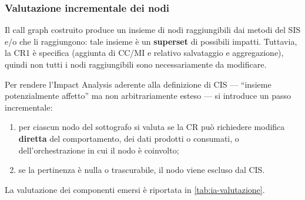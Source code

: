 \documentclass[11pt,a4paper]{article}
\begin{document}
\subsubsection{Valutazione incrementale dei nodi}
\label{sec:ia-cr1-valutazione}

Il call graph costruito produce un insieme di nodi raggiungibili dai metodi del
SIS e/o che li raggiungono: tale insieme \`e un \textbf{superset} di possibili
impatti. Tuttavia, la CR1 \`e specifica (aggiunta di CC/MI e relativo
salvataggio e aggregazione), quindi non tutti i nodi raggiungibili sono
necessariamente da modificare.

Per rendere l'Impact Analysis aderente alla definizione di CIS --- ``insieme
potenzialmente affetto'' ma non arbitrariamente esteso --- si introduce un passo
incrementale:

\begin{enumerate}[nosep]
  \item per ciascun nodo del sottografo si valuta se la CR pu\`o richiedere
    modifica \textbf{diretta} del comportamento, dei dati prodotti o consumati, o
    dell'orchestrazione in cui il nodo \`e coinvolto;
  \item se la pertinenza \`e nulla o trascurabile, il nodo viene escluso dal CIS.
\end{enumerate}

La valutazione dei componenti emersi \`e riportata in \cref{tab:ia-valutazione}.
\end{document}
